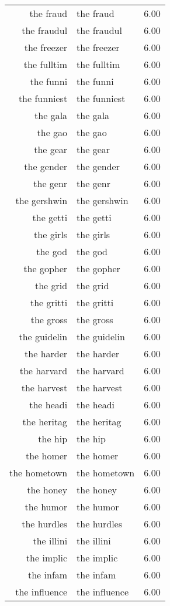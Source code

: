 \begin{table}[ht]
\begin{tabular}{rlr}
  the fraud & the fraud & 6.00 \\ 
  the fraudul & the fraudul & 6.00 \\ 
  the freezer & the freezer & 6.00 \\ 
  the fulltim & the fulltim & 6.00 \\ 
  the funni & the funni & 6.00 \\ 
  the funniest & the funniest & 6.00 \\ 
  the gala & the gala & 6.00 \\ 
  the gao & the gao & 6.00 \\ 
  the gear & the gear & 6.00 \\ 
  the gender & the gender & 6.00 \\ 
  the genr & the genr & 6.00 \\ 
  the gershwin & the gershwin & 6.00 \\ 
  the getti & the getti & 6.00 \\ 
  the girls & the girls & 6.00 \\ 
  the god & the god & 6.00 \\ 
  the gopher & the gopher & 6.00 \\ 
  the grid & the grid & 6.00 \\ 
  the gritti & the gritti & 6.00 \\ 
  the gross & the gross & 6.00 \\ 
  the guidelin & the guidelin & 6.00 \\ 
  the harder & the harder & 6.00 \\ 
  the harvard & the harvard & 6.00 \\ 
  the harvest & the harvest & 6.00 \\ 
  the headi & the headi & 6.00 \\ 
  the heritag & the heritag & 6.00 \\ 
  the hip & the hip & 6.00 \\ 
  the homer & the homer & 6.00 \\ 
  the hometown & the hometown & 6.00 \\ 
  the honey & the honey & 6.00 \\ 
  the humor & the humor & 6.00 \\ 
  the hurdles & the hurdles & 6.00 \\ 
  the illini & the illini & 6.00 \\ 
  the implic & the implic & 6.00 \\ 
  the infam & the infam & 6.00 \\ 
  the influence & the influence & 6.00 \\ 

\end{tabular}
\end{table}
